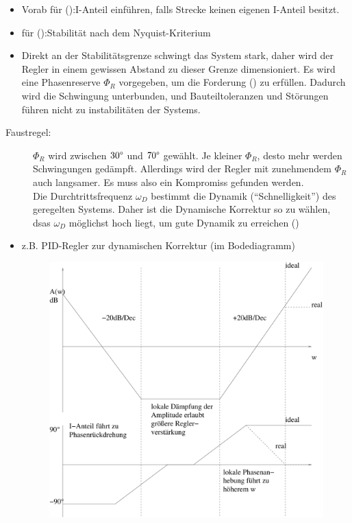 \documentclass[12pt,a4paper,ngerman]{scrartcl}
\newcommand{\RM}[1]{\MakeUppercase{\romannumeral #1{.}}}
\begin{document}
\begin{itemize}
\item Vorab für (\RM{2}):I-Anteil einführen, falls Strecke keinen eigenen I-Anteil besitzt.
\item für (\RM{1}):Stabilität nach dem Nyquist-Kriterium
\item Direkt an der Stabilitätsgrenze schwingt das System stark, daher wird der Regler in einem gewissen Abstand zu dieser Grenze dimensioniert. Es wird eine Phasenreserve $\Phi_R$ vorgegeben, um die Forderung (\RM{3}) zu erfüllen. Dadurch wird die Schwingung unterbunden, und Bauteiltoleranzen und Störungen führen nicht zu instabilitäten der Systems.
\end{itemize}
\begin{description}
\item[Faustregel:] $\Phi_R$ wird zwischen $30\degree$ und $70\degree$ gewählt. Je kleiner $\Phi_R$, desto mehr werden Schwingungen gedämpft. Allerdings wird der Regler mit zunehmendem $\Phi_R$ auch langsamer. Es muss also ein Kompromiss gefunden werden.\\
Die Durchtrittsfrequenz $\omega_D$ bestimmt die Dynamik (``Schnelligkeit'') des geregelten Systems. Daher ist die Dynamische Korrektur so zu wählen, dsas $\omega_D$ möglichst hoch liegt, um gute Dynamik zu erreichen (\RM{4})  
\end{description}
\begin{itemize}
\item z.B. PID-Regler zur dynamischen Korrektur (im Bodediagramm)
  \begin{figure}[H]
    \centering
\includegraphics[width=.7\linewidth]{sysregel_PID}
  \end{figure}
\end{itemize}
\end{document}
